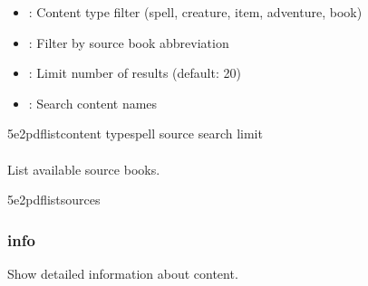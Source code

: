 \documentclass[letterpaper,10pt,english]{sphinxmanual}
\begin{document}
\sphinxAtStartPar
{}
\begin{itemize}
\item {} 
\sphinxAtStartPar
{}: Content type filter (spell, creature, item, adventure, book)

\item {} 
\sphinxAtStartPar
{}: Filter by source book abbreviation

\item {} 
\sphinxAtStartPar
{}: Limit number of results (default: 20)

\item {} 
\sphinxAtStartPar
{}: Search content names

\end{itemize}

\sphinxAtStartPar
{}

\begin{sphinxVerbatim}[commandchars=\\\{\}]
5e2pdflistcontent
\PYGZhy{}\PYGZhy{}typespell
\PYGZhy{}\PYGZhy{}source
\PYGZhy{}\PYGZhy{}search
\PYGZhy{}\PYGZhy{}limit
\end{sphinxVerbatim}


\paragraph{}
\label{\detokenize{user-guide/cli-reference:sources}}
\sphinxAtStartPar
List available source books.

\begin{sphinxVerbatim}[commandchars=\\\{\}]
5e2pdflistsources
\end{sphinxVerbatim}


\subsubsection{info}
\label{\detokenize{user-guide/cli-reference:info}}
\sphinxAtStartPar
Show detailed information about content.
\end{document}
